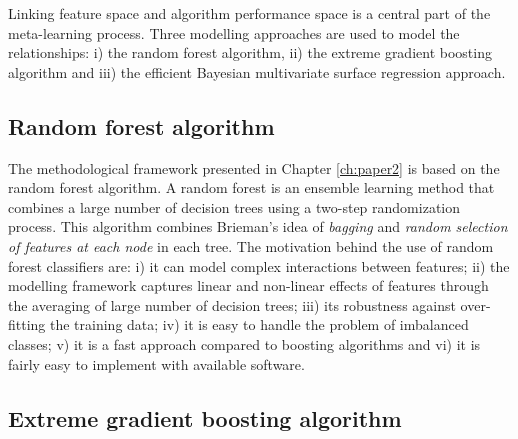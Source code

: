 \documentclass{monashthesis}
\begin{document}
Linking feature space and algorithm performance space is a central part of the meta-learning process. Three modelling approaches are used to model the relationships: i) the random forest algorithm, ii) the extreme gradient boosting algorithm and iii) the efficient Bayesian multivariate surface regression approach.

\hypertarget{random-forest-algorithm}{%
\subsection{Random forest algorithm}\label{random-forest-algorithm}}

The methodological framework presented in Chapter \ref{ch:paper2} is based on the random forest algorithm. A random forest \autocite{breiman2001random} is an ensemble learning method that combines a large number of decision trees using a two-step randomization process. This algorithm combines Brieman's idea of \emph{bagging} and \emph{random selection of features at each node} in each tree. The motivation behind the use of random forest classifiers are: i) it can model complex interactions between features; ii) the modelling framework captures linear and non-linear effects of features through the averaging of large number of decision trees; iii) its robustness against over-fitting the training data; iv) it is easy to handle the problem of imbalanced classes; v) it is a fast approach compared to boosting algorithms and vi) it is fairly easy to implement with available software.

\hypertarget{extreme-gradient-boosting-algorithm}{%
\subsection{Extreme gradient boosting algorithm}\label{extreme-gradient-boosting-algorithm}}
\end{document}

